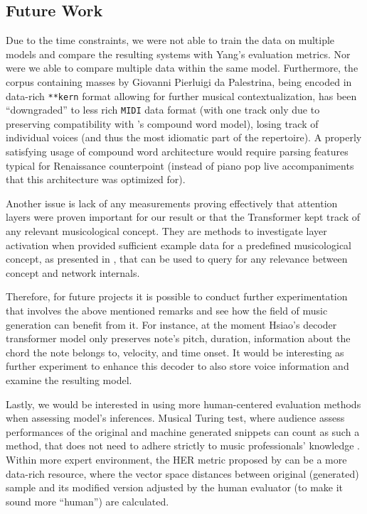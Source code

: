 \documentclass{article}
\begin{document}
\begin{multicols}{2}

    \section{Future Work}
    Due to the time constraints, we were not able to train the data on multiple models and compare the resulting systems with Yang's evaluation metrics. Nor were we able to compare multiple data within the same model. Furthermore, the corpus containing masses by Giovanni Pierluigi da Palestrina, being encoded in data-rich \texttt{**kern} format allowing for further musical contextualization, has been ``downgraded'' to less rich \texttt{MIDI} data format (with one track only due to preserving compatibility with \cite{hsiao_compound_2021}'s compound word model), losing track of individual voices (and thus the most idiomatic part of the repertoire). A properly satisfying usage of compound word architecture would require parsing features typical for Renaissance counterpoint (instead of piano pop live accompaniments that this architecture was optimized for).

    Another issue is lack of any measurements proving effectively that attention layers were proven important for our result or that the Transformer kept track of any relevant musicological concept. They are methods to investigate layer activation when provided sufficient example data for a predefined musicological concept, as presented in \cite{ConceptBasedTechniques}, that can be used to query for any relevance between concept and network internals.
    
    Therefore, for future projects it is possible to conduct further experimentation that involves the above mentioned remarks and see how the field of music generation can benefit from it. For instance, at the moment Hsiao's decoder transformer model only preserves note's pitch, duration, information about the chord the note belongs to, velocity, and time onset. It would be interesting as further experiment to enhance this decoder to also store voice information and examine the resulting model.

    Lastly, we would be interested in using more human-centered evaluation methods when assessing model's inferences. Musical Turing test, where audience assess performances of the original and machine generated snippets can count as such a method, that does not need to adhere strictly to music professionals' knowledge \cite{musicTuringTest}. Within more expert environment, the HER metric proposed by \cite{kalonaris_computational_2020} can be a more data-rich resource, where the vector space distances between original (generated) sample and its modified version adjusted by the human evaluator (to make it sound more ``human'') are calculated.


\end{multicols}
\end{document}
